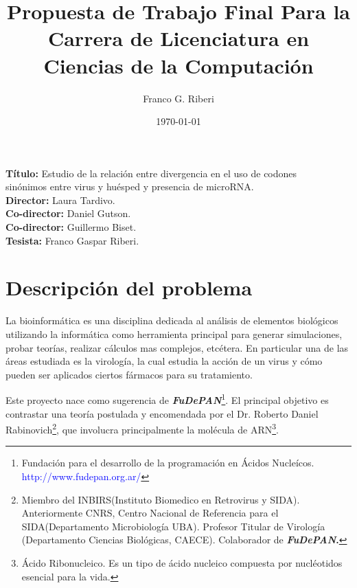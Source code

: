\documentclass[12pt,a4paper]{article}
\begin{document}
 

\title{Propuesta de Trabajo Final Para la Carrera de Licenciatura en Ciencias de la Computación}
		\vskip 2cm
\author{Franco G. Riberi}
		\vskip 2cm
\date{\today} 	

\maketitle

\noindent \textbf{Título:} Estudio de la relación entre divergencia en el uso de codones \\
sinónimos entre virus y huésped y presencia de microRNA. \\
\vskip 0.01cm
\noindent \textbf{Director:} Laura Tardivo.\\ 
\vskip 0.01cm
\noindent \textbf{Co-director:}  Daniel Gutson.\\
\vskip 0.01cm
\noindent \textbf{Co-director:}  Guillermo Biset.\\
\vskip 0.01cm
\noindent \textbf{Tesista:} Franco Gaspar Riberi. \\

\section{Descripción del problema}

\par La bioinformática es una disciplina dedicada al análisis de elementos biológicos utilizando la
informática como herramienta principal para generar simulaciones, probar teorías,  realizar cálculos mas complejos, etcétera. En particular una de las áreas estudiada es la virología, la cual estudia la acción de un virus y cómo pueden ser aplicados ciertos fármacos para su tratamiento. 

\par Este proyecto nace como sugerencia de \textbf{\textit{FuDePAN}}\footnote{Fundación para el desarrollo de la programación en Ácidos Nucleícos. \textcolor{blue}{http://www.fudepan.org.ar/}}. El principal objetivo es contrastar una teoría postulada y encomendada por el Dr. Roberto Daniel Rabinovich\footnote{Miembro del INBIRS(Instituto Biomedico en Retrovirus y SIDA). Anteriormente CNRS, Centro Nacional de Referencia para el SIDA(Departamento Microbiología UBA). Profesor Titular de Virología (Departamento Ciencias Biológicas, CAECE). Colaborador de \textbf{\textit{FuDePAN}.}}, que involucra principalmente la molécula de ARN\footnote{Ácido Ribonucleico. Es un tipo de ácido nucleico compuesta por nucléotidos esencial para la vida.}.
\end{document}
